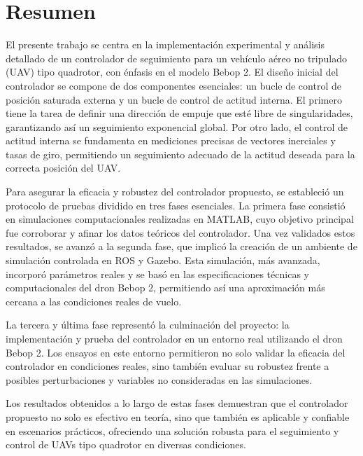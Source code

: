 \newpage
%
\chapter*{Resumen} 
El presente trabajo se centra en la implementación experimental y análisis detallado de un controlador de seguimiento para un vehículo aéreo no tripulado (UAV) tipo quadrotor, con énfasis en el modelo Bebop 2. El diseño inicial del controlador se compone de dos componentes esenciales: un bucle de control de posición saturada externa y un bucle de control de actitud interna. El primero tiene la tarea de definir una dirección de empuje que esté libre de singularidades, garantizando así un seguimiento exponencial global. Por otro lado, el control de actitud interna se fundamenta en mediciones precisas de vectores inerciales y tasas de giro, permitiendo un seguimiento adecuado de la actitud deseada para la correcta posición del UAV.

Para asegurar la eficacia y robustez del controlador propuesto, se estableció un protocolo de pruebas dividido en tres fases esenciales. La primera fase consistió en simulaciones computacionales realizadas en MATLAB, cuyo objetivo principal fue corroborar y afinar los datos teóricos del controlador. Una vez validados estos resultados, se avanzó a la segunda fase, que implicó la creación de un ambiente de simulación controlada en ROS y Gazebo. Esta simulación, más avanzada, incorporó parámetros reales y se basó en las especificaciones técnicas y computacionales del dron Bebop 2, permitiendo así una aproximación más cercana a las condiciones reales de vuelo.

La tercera y última fase representó la culminación del proyecto: la implementación y prueba del controlador en un entorno real utilizando el dron Bebop 2. Los ensayos en este entorno permitieron no solo validar la eficacia del controlador en condiciones reales, sino también evaluar su robustez frente a posibles perturbaciones y variables no consideradas en las simulaciones.

Los resultados obtenidos a lo largo de estas fases demuestran que el controlador propuesto no solo es efectivo en teoría, sino que también es aplicable y confiable en escenarios prácticos, ofreciendo una solución robusta para el seguimiento y control de UAVs tipo quadrotor en diversas condiciones.

\newpage
\thispagestyle{empty}
$\ $